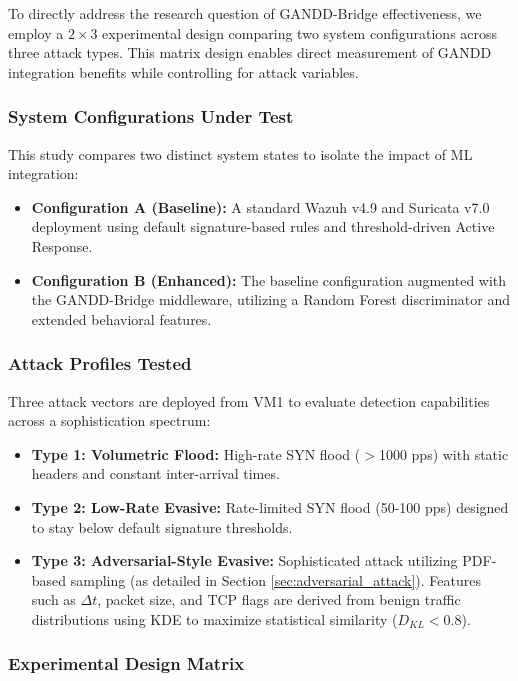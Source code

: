 To directly address the research question of GANDD-Bridge effectiveness, we employ a $2 \times 3$ experimental design comparing two system configurations across three attack types. This matrix design enables direct measurement of GANDD integration benefits while controlling for attack variables.

\subsubsection{System Configurations Under Test}

This study compares two distinct system states to isolate the impact of ML integration:
\begin{itemize}
    \item \textbf{Configuration A (Baseline):} A standard Wazuh v4.9 and Suricata v7.0 deployment using default signature-based rules and threshold-driven Active Response.
    \item \textbf{Configuration B (Enhanced):} The baseline configuration augmented with the GANDD-Bridge middleware, utilizing a Random Forest discriminator and extended behavioral features.
\end{itemize}

\subsubsection{Attack Profiles Tested}

Three attack vectors are deployed from VM1 to evaluate detection capabilities across a sophistication spectrum:
\begin{itemize}
    \item \textbf{Type 1: Volumetric Flood:} High-rate SYN flood ($>$1000 pps) with static headers and constant inter-arrival times.
    \item \textbf{Type 2: Low-Rate Evasive:} Rate-limited SYN flood (50-100 pps) designed to stay below default signature thresholds.
    \item \textbf{Type 3: Adversarial-Style Evasive:} Sophisticated attack utilizing PDF-based sampling (as detailed in Section \ref{sec:adversarial_attack}). Features such as $\Delta t$, packet size, and TCP flags are derived from benign traffic distributions using KDE to maximize statistical similarity ($D_{KL} < 0.8$).
\end{itemize}

\subsubsection{Experimental Design Matrix}

